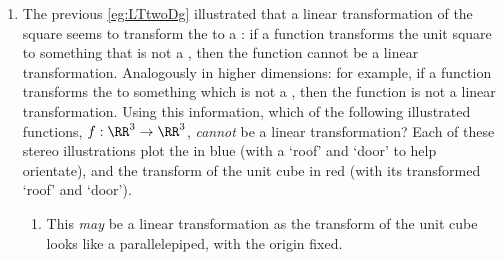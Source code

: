 \begin{example}
\begin{enumerate}[ref=\ref{eg:ltHiD}(\alph*)]
\item\label{eg:LTthreeDg}
The previous \cref{eg:LTtwoDg} illustrated that a linear transformation of the square seems to transform the  to a : if a function transforms the unit square to something that is not a , then the function cannot be a linear transformation.
Analogously in higher dimensions: for example, if a function transforms the  to something which is not a , then the function is not a linear transformation.
Using this information, which of the following illustrated functions, \(f:\RR^3\to\RR^3\), \emph{cannot} be a linear transformation?
Each of these stereo illustrations plot the  in blue (with a `roof' and `door' to help orientate), and the transform of the unit cube in red (with its transformed `roof' and `door').
\begin{enumerate}
\item \def\unithousesize{small}
This \emph{may} be a linear transformation as the transform of the unit cube looks like a parallelepiped, with the origin fixed. 



\end{enumerate}
\end{enumerate}
\end{example}
